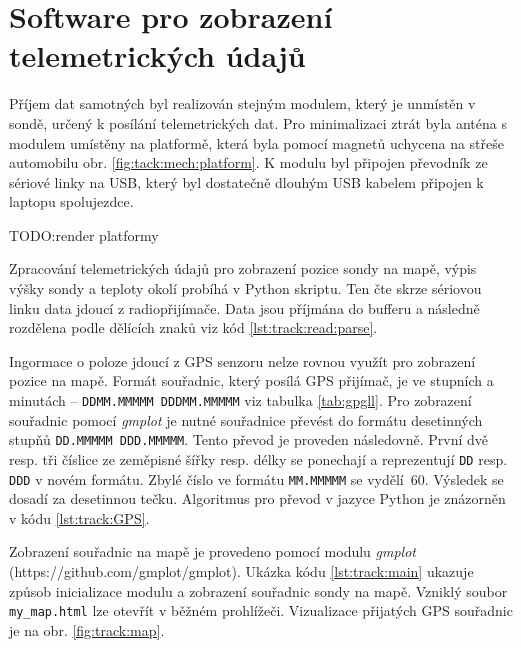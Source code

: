 \documentclass[twoside]{ctuthesis}
\theoremstyle{plain}
\theoremstyle{definition}
\theoremstyle{note}
\begin{document}
	\section{Software pro zobrazení telemetrických údajů}
	Příjem dat samotných byl realizován stejným modulem, který je unmístěn v sondě, určený k posílání telemetrických dat. Pro minimalizaci ztrát byla anténa s modulem umístěny na platformě, která byla pomocí magnetů uchycena na střeše automobilu obr. \ref{fig:tack:mech:platform}. K modulu byl připojen převodník ze sériové linky na USB, který byl dostatečně dlouhým USB kabelem připojen k laptopu spolujezdce.

	TODO:render platformy


	Zpracování telemetrických údajů pro zobrazení pozice sondy na mapě, výpis výšky sondy a teploty okolí probíhá v Python skriptu. Ten čte skrze sériovou linku data jdoucí z radiopřijímače. Data jsou příjmána do bufferu a následně rozdělena podle dělících znaků viz kód \ref{lst:track:read:parse}.
	

	Ingormace o poloze jdoucí z GPS senzoru nelze rovnou využít pro zobrazení pozice na mapě. Formát souřadnic, který posílá GPS přijímač, je ve stupních a minutách -- \lstinline|DDMM.MMMMM DDDMM.MMMMM| viz tabulka \ref{tab:gpgll}. Pro zobrazení souřadnic pomocí \textit{gmplot} je nutné souřadnice převést do formátu desetinných stupňů \lstinline|DD.MMMMM DDD.MMMMM|. Tento převod je proveden následovně. První dvě resp. tři číslice ze zeměpisné šířky resp. délky se ponechají a reprezentují \lstinline|DD| resp. \lstinline|DDD| v novém formátu. Zbylé číslo ve formátu \lstinline|MM.MMMMM| se vydělí~60. Výsledek se dosadí za desetinnou tečku. Algoritmus pro převod v jazyce Python je znázorněn v kódu \ref{lst:track:GPS}.

	

	Zobrazení souřadnic na mapě je provedeno pomocí modulu \textit{gmplot} (https://github.com/gmplot/gmplot). Ukázka kódu \ref{lst:track:main} ukazuje způsob inicializace modulu a zobrazení souřadnic sondy na mapě. Vzniklý soubor \lstinline|my_map.html| lze otevřít v běžném prohlížeči. Vizualizace přijatých GPS souřadnic je na obr. \ref{fig:track:map}.

	
\end{document}
